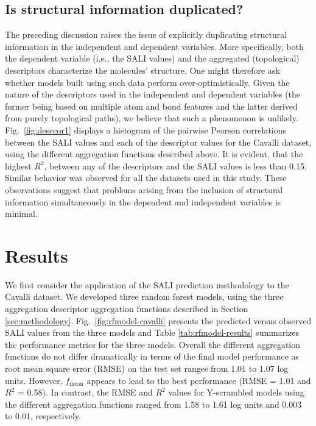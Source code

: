 \documentclass[letterpaper, 12pt]{article}
\begin{document}
\subsection{Is structural information duplicated?}
\label{sec:are-we-duplicating}

The preceding discussion raises the issue of explicitly duplicating structural information in the
independent and dependent variables. More specifically, both the dependent variable (i.e., the SALI
values) and the aggregated (topological) descriptors characterize the molecules' structure. One
might therefore ask whether models built using such data perform over-optimistically. Given the
nature of the descriptors used in the independent and dependent variables (the former being based on
multiple atom and bond features and the latter derived from purely topological paths), we believe
that such a phenomenon is unlikely.  Fig.~\ref{fig:desccor1} displays a histogram of the pairwise
Pearson correlations between the SALI values and each of the descriptor values for the
Cavalli\cite{Cavalli:2002aa} dataset, using the different aggregation functions described above. It
is evident, that the highest $R^2$, between any of the descriptors and the SALI values is less than
0.15. Similar behavior was observed for all the datasets used in this study. These observations
suggest that problems arising from the inclusion of structural information simultaneously in the
dependent and independent variables is minimal.

\section{Results}
\label{sec:applications}
We first consider the application of the SALI prediction methodology to the Cavalli dataset. We
developed three random forest models, using the three aggregation descriptor aggregation functions
described in Section \ref{sec:methodology}. Fig.~\ref{fig:rfmodel-cavalli} presents the predicted
versus observed SALI values from the three models and Table \ref{tab:rfmodel-results} summarizes the
performance metrics for the three models. Overall the different aggregation functions do not differ
dramatically in terms of the final model performance as root mean square error (RMSE) on the test
set ranges from 1.01 to 1.07 log units. However, $f_{\textrm{mean}}$ appears to lead to the best
performance (RMSE = 1.01 and $R^2$ = 0.58). In contrast, the RMSE and $R^2$ values for
Y-scrambled\cite{Rucker:2007aa} models using the different aggregation functions ranged from 1.58 to
1.61 log units and 0.003 to 0.01, respectively.
\end{document}
